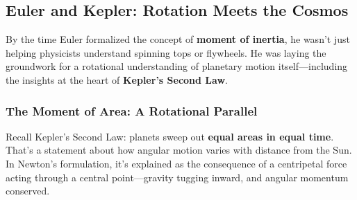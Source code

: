 \subsection{Euler and Kepler: Rotation Meets the Cosmos}

By the time Euler formalized the concept of \textbf{moment of inertia}, he wasn’t just helping physicists understand spinning tops or flywheels. He was laying the groundwork for a rotational understanding of planetary motion itself—including the insights at the heart of \textbf{Kepler’s Second Law}.

\subsubsection{The Moment of Area: A Rotational Parallel}

Recall Kepler’s Second Law: planets sweep out \textbf{equal areas in equal time}. That’s a statement about how angular motion varies with distance from the Sun. In Newton’s formulation, it’s explained as the consequence of a centripetal force acting through a central point—gravity tugging inward, and angular momentum conserved.

